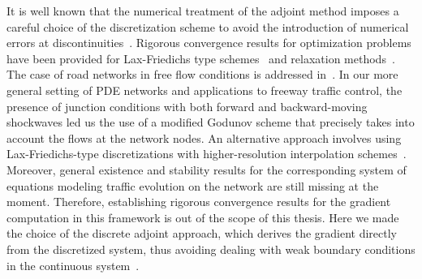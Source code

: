 It is well known that the numerical treatment of the adjoint method imposes a careful choice of the discretization scheme to avoid the introduction of numerical errors  at discontinuities~\cite{Giles2003Discrete}.
Rigorous convergence results for optimization problems have been provided for Lax-Friedichs type schemes~\cite{Giles2010Convergencea} and relaxation methods~\cite{Banda2012Adjoint}.
The case of road networks in free flow conditions is addressed in~\cite{Gugat2005}.
In our more general setting of PDE networks and applications to freeway traffic control, the presence of junction conditions with both forward and backward-moving shockwaves led us the use of a modified Godunov scheme that precisely takes into account the flows at the network nodes. An alternative approach involves using Lax-Friedichs-type discretizations with higher-resolution interpolation schemes~\cite{Nessyahu1990NonOscillatory}. Moreover, general existence and stability results for the corresponding system of equations modeling traffic evolution on the network are still missing at the moment.
Therefore, establishing rigorous convergence results for the gradient computation in this framework is out of the scope of this thesis. Here we made the choice of the discrete adjoint approach, which derives the gradient directly from the discretized system, thus avoiding dealing with weak boundary conditions in the continuous system~\cite{garavello2006traffic,work2010traffic,strub2006weak}.







